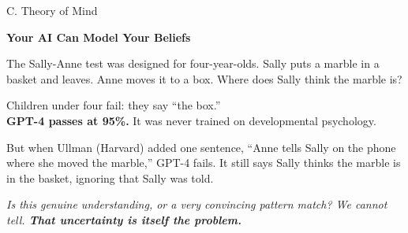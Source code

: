 \documentclass[aspectratio=169, 12pt]{beamer}
\begin{document}
\begin{frame}{C. Theory of Mind}
\begin{center}
  {\Large\bfseries Your AI Can Model Your Beliefs}
\end{center}
\vfill
{\small The Sally-Anne test was designed for four-year-olds.
Sally puts a marble in a basket and leaves. Anne moves it to a box.
Where does Sally think the marble is?

\medskip
Children under four fail: they say ``the box.''\\
\textbf{GPT-4 passes at 95\%.}
It was never trained on developmental psychology.

\medskip
But when Ullman (Harvard) added one sentence, ``Anne tells Sally on the
phone where she moved the marble,'' \alert{GPT-4 fails}. It still says
Sally thinks the marble is in the basket, ignoring that Sally was told.}

\vfill
{\small\itshape Is this genuine understanding, or a very convincing pattern
match? We cannot tell. \textbf{That uncertainty is itself the problem.}}
\end{frame}
\end{document}
